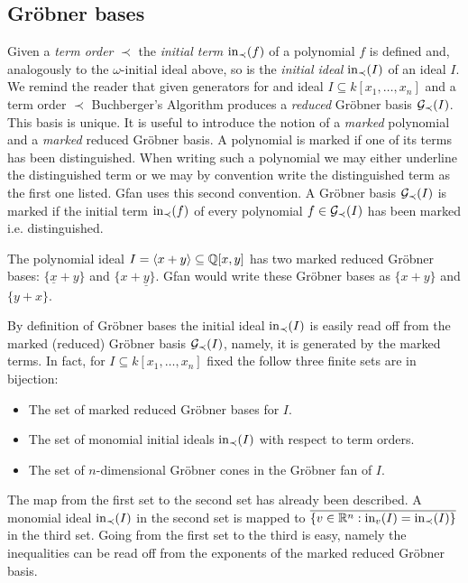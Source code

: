 \subsection{Gr\"obner bases}
Given a \emph{term order} $\prec$ the \emph{initial term} $\textup{in}_\prec(f)$ of a
polynomial $f$ is defined and, analogously to the $\omega$-initial
ideal above, so is the \emph{initial ideal} $\textup{in}_\prec(I)$ of an ideal $I$.
We remind the reader that given generators for and ideal $I\subseteq
k[x_1,\dots,x_n]$ and a term order $\prec$ Buchberger's
Algorithm produces a \emph{reduced} Gr\"obner basis
$\mathcal{G}_\prec(I)$. This basis is unique. It is useful to introduce the
notion of a \emph{marked} polynomial and a \emph{marked} reduced
Gr\"obner basis. A polynomial is marked if one of its terms has been
distinguished. When writing such a polynomial we may either underline
the distinguished term or we may by convention write the distinguished
term as the first one listed. Gfan uses this second convention. A
Gr\"obner basis $\mathcal{G}_\prec(I)$ is marked if the initial term
$\textup{in}_\prec(f)$ of every polynomial $f\in\mathcal{G}_\prec(I)$ has been marked
i.e. distinguished.
\begin{example}
The polynomial ideal $I=\langle x+y\rangle\subseteq \mathbb{Q}[x,y]$ has two
marked reduced Gr\"obner bases: $\{\underline{x}+y\}$ and
$\{x+\underline{y}\}$. Gfan would write these Gr\"obner bases as
$\{x+y\}$ and $\{y+x\}$.
\end{example}
By definition of Gr\"obner bases the initial ideal
$\textup{in}_\prec(I)$ is easily read off from the marked (reduced)
Gr\"obner basis $\mathcal{G}_\prec(I)$, namely, it is generated by the marked
terms. In fact, for $I\subseteq k[x_1,\dots,x_n]$ fixed the follow
three finite sets are in bijection:
\begin{itemize}
\item The set of marked reduced Gr\"obner bases for $I$.
\item The set of monomial initial ideals $\textup{in}_\prec(I)$ with respect to term orders.
\item The set of $n$-dimensional Gr\"obner cones in the Gr\"obner fan of $I$.
\end{itemize}
The map from the first set to the second set has already been
described. A monomial ideal $\textup{in}_\prec(I)$ in the second set is
mapped to $\overline{\{v\in\mathbb{R}^n:\textup{in}_v(I)=\textup{in}_\prec(I)\}}$ in the
third set. Going from the first set to the third is easy, namely the
inequalities can be read off from the exponents of the marked reduced
Gr\"obner basis.
